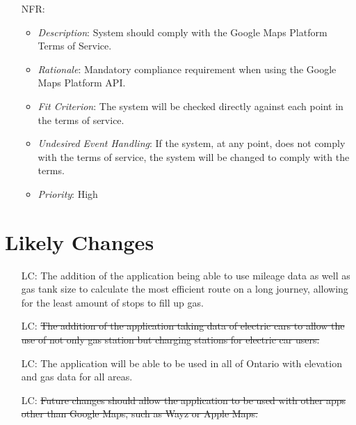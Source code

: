\documentclass[12pt]{article}
\newcounter{nfrnum} %
\newcounter{lcnum} %
\begin{document}
\begin{itemize}
\item[NFR\refstepcounter{nfrnum}\thenfrnum \label{NFR_21}:] 
\begin{itemize}
  \item \textit{Description}: System should comply with the Google Maps Platform Terms of Service.
  \item \textit{Rationale}: Mandatory compliance requirement when using the Google Maps Platform API. 
  \item \textit{Fit Criterion}: The system will be checked directly against each point in the terms of service.
  \item \textit{Undesired Event Handling}: If the system, at any point, does not comply with the terms of service, the system will be changed to comply with the terms.
  \item \textit{Priority}: High
\end{itemize}

\end{itemize}

\newpage

\section{Likely Changes}    

\noindent \begin{itemize}

\item[LC\refstepcounter{lcnum}\thelcnum\label{Long Journey}:] The addition of the application being able to use mileage data as well as gas tank size to calculate the most efficient route on a long journey, allowing for the least amount of stops to fill up gas.

\item[LC\refstepcounter{lcnum}\thelcnum\label{Electric Cars}:] \sout{The addition of the application taking data of electric cars to allow the use of not only gas station but charging stations for electric car users.}

\item[LC\refstepcounter{lcnum}\thelcnum\label{Bigger Area}:] The application will be able to be used in all of Ontario with elevation and gas data for all areas.

\item[LC\refstepcounter{lcnum}\thelcnum\label{Application Integration}:] \sout{Future changes should allow the application to be used with other apps other than Google Maps, such as Wayz or Apple Maps.}

\end{itemize}
\end{document}
